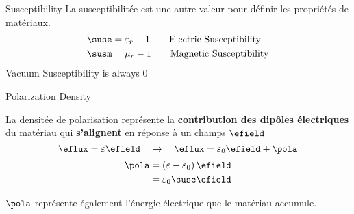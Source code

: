 \begin{frame}{Susceptibility}
    La susceptibilitée est une autre valeur pour définir les propriétés de matériaux.
    \begin{equation}
        \begin{aligned}
            \suse &=  \varepsilon_r - 1 \hspace{2em} \text{Electric Susceptibility}\\
            \susm &=  \mu_r - 1 \hspace{2em} \text{Magnetic Susceptibility}
        \end{aligned}
    \end{equation}
    \vspace{20pt}
    Vacuum Susceptibility is always 0
\end{frame}

\begin{frame}{Polarization Density}
    \begin{twocolumns}[0.6]
        \leftcol
        La densitée de polarisation représente la \textbf{contribution des dipôles électriques} du matériau qui \textbf{s'alignent} en réponse à un champs $\efield$
        \begin{equation*}
            \eflux = \varepsilon \efield \hspace{1em} \rightarrow \hspace{1em} \eflux = \varepsilon_0 \efield + \pola
        \end{equation*}
        \vspace{10pt}
        \begin{equation*}
            \begin{aligned}
                \pola &=  \left(\varepsilon - \varepsilon_0 \right) \efield\\
                &= \varepsilon_0 \suse \efield
            \end{aligned}
        \end{equation*}
        \rightcol
    \end{twocolumns}
    \centering
    $\pola$ représente également l'énergie électrique que le matériau accumule.
\end{frame}

